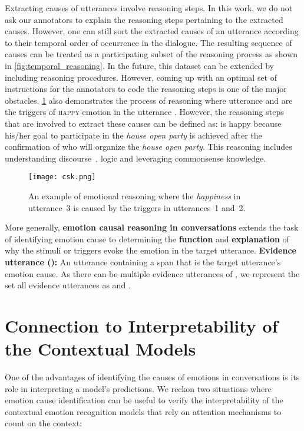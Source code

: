 \documentclass[smallextended]{svjour3}
\newcommand\emo[1]{\textsc{#1}}
\newcommand\0{\hphantom{0}}
\begin{document}
Extracting causes of utterances involve reasoning steps. In this work, we do not ask our annotators to explain the reasoning steps pertaining to the extracted causes. However, one can still sort the extracted causes of an utterance according to their temporal order of occurrence in the dialogue. The resulting sequence of causes can be treated as a participating subset of the reasoning process as shown in \cref{fig:temporal_reasoning}. In the future, this dataset can be extended by including reasoning procedures. However, coming up with an optimal set of instructions for the annotators to code the reasoning steps is one of the major obstacles. \cref{fig:csk_exx} also demonstrates the process of reasoning where utterance  and  are the triggers of \emo{happy} emotion in the utterance . However, the reasoning steps that are involved to extract these causes can be defined as:  is happy because his/her goal to participate in the \textit{house open party} is achieved after the confirmation of  who will organize the \textit{house open party}. This reasoning includes understanding discourse~\cite{chakrabarty-etal-2019-ampersand}, logic and leveraging commonsense knowledge.
\begin{figure}[ht!]
    \centering
    \texttt{[image: csk.png]}
    \caption{{An example of emotional reasoning where the \emph{happiness} in utterance~3 is caused by the triggers in utterances~1 and~2.}}
    \label{fig:csk_exx}
\end{figure}

More generally, 
\textbf{emotion causal reasoning in conversations}
extends the task of identifying emotion cause to determining the \textbf{function} and \textbf{explanation} of why the stimuli or triggers evoke the emotion in the target utterance. 
\textbf{Evidence utterance ():} An utterance containing a span that is the target utterance's emotion cause. As there can be multiple evidence utterances of , we represent the set all evidence utterances as  and . 












\section{Connection to Interpretability of the Contextual Models}
One of the advantages of identifying the causes of emotions in conversations is its role in interpreting a model's predictions. We reckon two situations where emotion cause identification can be useful to verify the interpretability of the contextual emotion recognition models that rely on attention mechanisms to count on the context:
\end{document}
